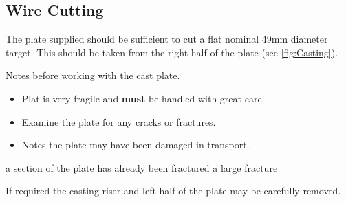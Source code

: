 \subsection{Wire Cutting}
The plate supplied should be sufficient to cut a flat nominal 49mm diameter target. This should be taken from the right half of the plate (see \ref{fig:Casting}). 

Notes before working with the cast plate.
\begin{itemize}
\item Plat is very fragile and \textbf{must} be handled with great care. 
\item Examine the plate for any cracks or fractures. 
\item Notes the plate may have been damaged in transport. 
\end{itemize}

a section of the plate has already been fractured a large fracture 

If required the casting riser and left half of the plate may be carefully removed.